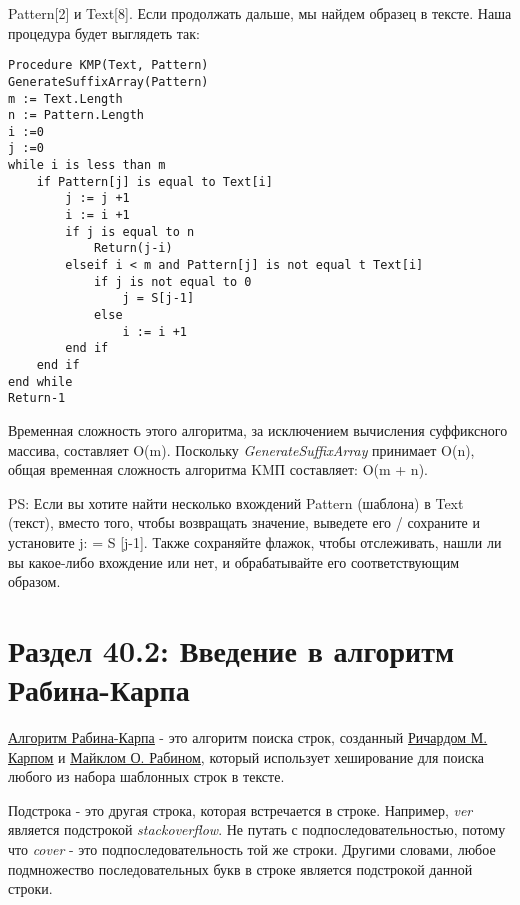 Pattern[2] и Text[8]. Если продолжать дальше, мы найдем образец в тексте. Наша процедура
будет выглядеть так:
\vspace{\baselineskip}
\begin{tcolorbox}
\begin{verbatim}
Procedure KMP(Text, Pattern)
GenerateSuffixArray(Pattern)
m := Text.Length
n := Pattern.Length
i :=0
j :=0
while i is less than m
    if Pattern[j] is equal to Text[i]
        j := j +1
        i := i +1
        if j is equal to n
            Return(j-i)
        elseif i < m and Pattern[j] is not equal t Text[i]
            if j is not equal to 0
                j = S[j-1]
            else
                i := i +1
        end if
    end if
end while
Return-1
\end{verbatim}
\end{tcolorbox}
\vspace{\baselineskip}
Временная сложность этого алгоритма, за исключением вычисления суффиксного массива,
составляет O(m). Поскольку \textit{GenerateSuffixArray} принимает O(n), общая временная сложность
алгоритма KMП составляет: O(m + n).
\vspace{\baselineskip}

PS: Если вы хотите найти несколько вхождений Pattern (шаблона) в Text (текст), вместо того,
чтобы возвращать значение, выведете его / сохраните и установите j: = S [j-1]. Также
сохраняйте флажок, чтобы отслеживать, нашли ли вы какое-либо вхождение или нет, и
обрабатывайте его соответствующим образом.

\section*{Раздел 40.2: Введение в алгоритм Рабина-Карпа}
\href{https://en.wikipedia.org/wiki/Rabin%
}{\underline{Алгоритм Рабина-Карпа}}
- это алгоритм поиска строк, созданный \href{https://en.wikipedia.org/wiki/Richard_M._Karp}{\underline{Ричардом М. Карпом}} и \newline
\href{https://en.wikipedia.org/wiki/Michael_O._Rabin}{\underline{Майклом О. Рабином}}, который использует хеширование для поиска любого из набора
шаблонных строк в тексте.
\vspace{\baselineskip}

Подстрока - это другая строка, которая встречается в строке. Например, \textit{ver} является
подстрокой \textit{stackoverflow}. Не путать с подпоследовательностью, потому что \textit{cover} - это
подпоследовательность той же строки. Другими словами, любое подмножество
последовательных букв в строке является подстрокой данной строки.
\vspace{\baselineskip}

